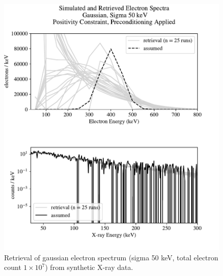 \begin{figure}[p]
    \centering
    \includegraphics[width=\textwidth]{figures/chapter_4/synthetic_data_examples/gauss_50keV_posonly_preconditioning_1e7_particles}
    \caption{Retrieval of gaussian electron spectrum (sigma 50 keV, total electron count $1\times10^7$) from synthetic X-ray data.}
    \label{why_non_negative_is_good}
\end{figure}

